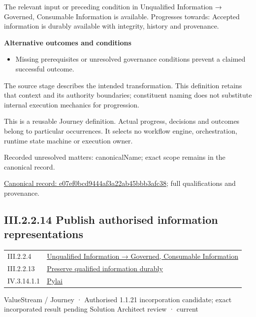 The relevant input or preceding condition in Unqualified Information → Governed, Consumable Information is available. Progresses towards: Accepted information is durably available with integrity, history and provenance.



\par\medskip\textbf{Alternative outcomes and conditions}\par


\begin{itemize}


\item Missing prerequisites or unresolved governance conditions prevent a claimed successful outcome.

\end{itemize}


The source stage describes the intended transformation. This definition retains that context and its authority boundaries; constituent naming does not substitute internal execution mechanics for progression.



This is a reusable Journey definition. Actual progress, decisions and outcomes belong to particular occurrences. It selects no workflow engine, orchestration, runtime state machine or execution owner.


{\small Recorded unresolved matters: canonicalName; exact scope remains in the canonical record.}\par
{\footnotesize \href{../../../../../../../continuum/strategy/value-stream/e07ef0bcd9444af3a22ab45bbb3afc38.md}{Canonical record: e07ef0bcd9444af3a22ab45bbb3afc38}; full qualifications and provenance.}\par
\subsection*{III.2.2.14 Publish authorised information representations}
\label{navigation:III.2.2.14}

\begin{longtable}{p{.22\linewidth}p{.73\linewidth}}
III.2.2.4 & \hyperref[element:02e036f18bab400bac261007e39457ee]{Unqualified Information → Governed, Consumable Information} \\
III.2.2.13 & \hyperref[element:e07ef0bcd9444af3a22ab45bbb3afc38]{Preserve qualified information durably} \\
IV.3.14.1.1 & \hyperref[element:e3e4147fea3640198dc251ed41ee854d]{Pylai} \\
\end{longtable}
\label{element:91da459e860e4f359e440a65f0c94bcb}
{\small ValueStream / Journey · Authorised 1.1.21 incorporation candidate; exact incorporated result pending Solution Architect review · current}\par

